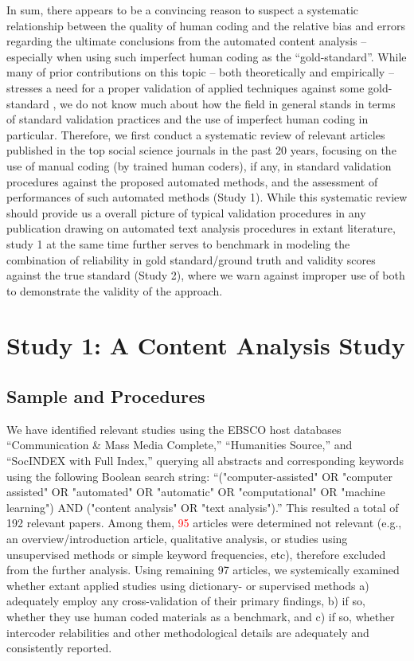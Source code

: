 \documentclass[man, 12pt, a4paper, nolmodern, noextraspace]{apa6}
\begin{document}
    In sum, there appears to be a convincing reason to suspect a systematic relationship between the quality of human coding and the relative bias and errors regarding the ultimate conclusions from the automated content analysis -- especially when using such imperfect human coding as the ``gold-standard''. While many of prior contributions on this topic -- both theoretically and empirically -- stresses a need for a proper validation of applied techniques against some gold-standard \parencites[e.g.,][]{grimmer2013text, Hopkins_King2010, gonzalez2015signals}, we do not know much about how the field in general stands in terms of standard validation practices and the use of imperfect human coding in particular. Therefore, we first conduct a systematic review of relevant articles published in the top social science journals in the past 20 years, focusing on the use of manual coding (by trained human coders), if any, in standard validation procedures against the proposed automated methods, and the assessment of performances of such automated methods (Study 1). While this systematic review should provide us a overall picture of typical validation procedures in any publication drawing on automated text analysis procedures in extant literature, study 1 at the same time further serves to benchmark in modeling the combination of reliability in gold standard/ground truth and validity scores against the true standard (Study 2), where we warn against improper use of both to demonstrate the validity of the approach.

\section{Study 1: A Content Analysis Study}

\subsection{Sample and Procedures}

    We have identified relevant studies using the EBSCO host databases “Communication \& Mass Media Complete,” “Humanities Source,” and “SocINDEX with Full Index,” querying all abstracts and corresponding keywords using the following Boolean search string: “("computer-assisted" OR "computer assisted" OR "automated" OR "automatic" OR "computational" OR "machine learning") AND ("content analysis" OR "text analysis").” This resulted a total of 192 relevant papers. Among them, \textcolor{red}{95} articles were determined not relevant (e.g., an overview/introduction article, qualitative analysis, or studies using unsupervised methods or simple keyword frequencies, etc), therefore excluded from the further analysis. Using remaining 97 articles, we systemically examined whether extant applied studies using dictionary- or supervised methods a) adequately employ any cross-validation of their primary findings, b) if so, whether they use human coded materials as a benchmark, and c) if so, whether intercoder relabilities and other methodological details are adequately and consistently reported. 
    
\end{document}
